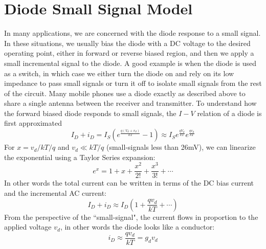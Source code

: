\section{Diode Small Signal Model}
In many applications, we are concerned with the diode response to a small signal.  In these situations, we usually bias the diode with a DC voltage to the desired operating point, either in forward or reverse biased region, and then we apply a small incremental signal to the diode.  A good example is when the diode is used as a switch, in which case we either turn the diode on and rely on its low impedance to pass small signals or turn it off to isolate small signals from the rest of the circuit. Many mobile phones use a diode exactly as described above to share a single antenna between the receiver and transmitter.  
To understand how the forward biased diode responds to small signals, the $I-V$ relation of a diode is first approximated
    \begin{equation}
        {I_D} + {i_D} = {I_S}\left( {{e^{\frac{{q({V_d} + {v_d})}}{{kT}}}} - 1} \right) \approx {I_S}{e^{\frac{{q{V_d}}}{{kT}}}}{e^{\frac{{q{v_d}}}{{kT}}}}
    \end{equation}
For $x = v_d/kT/q$ and $v_d \ll kT/q$ (small-signals less than 26mV),  we can linearize the exponential using a Taylor Series expansion:
    \begin{equation}
        {e^x} = 1 + x + \frac{{{x^2}}}{{2!}} + \frac{{{x^3}}}{{3!}} +  \cdots 
    \end{equation}
In other words the total current can be written in terms of the DC bias current and the incremental AC current:
    \begin{equation}
        {I_D} + {i_D} \approx {I_D}\left( {1 + \frac{{q{v_d}}}{{kT}} +  \cdots } \right)
    \end{equation}
From the perspective of the ``small-signal", the current flows in proportion to the applied voltage $v_d$, in other words the diode looks like a conductor:
    \begin{equation}
        {i_D} \approx \frac{{q{v_d}}}{{kT}} = {g_d}{v_d}
    \end{equation}
